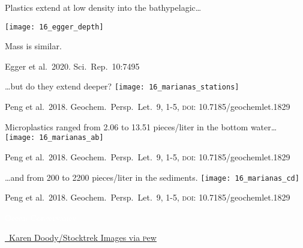 \documentclass[t]{beamer}
\begin{document}
\begin{frame}[b]{Plastics extend at low density into the bathypelagic\dots}

\texttt{[image: 16\_egger\_depth]}

\hangpara Mass is similar.

\tinyfill Egger et al.~2020. Sci.\ Rep.\ 10:7495

\end{frame}
%

\begin{frame}{\dots but do they extend deeper?}
\texttt{[image: 16\_marianas\_stations]}

\tinyfill Peng et al.\ 2018. Geochem.\ Persp.\ Let.\ 9, 1-5, \textsc{doi:} 10.7185/geochemlet.1829
\end{frame}
%
\begin{frame}{Microplastics ranged from 2.06 to 13.51 pieces/liter in the bottom water\dots}
\texttt{[image: 16\_marianas\_ab]}

\tinyfill Peng et al.\ 2018. Geochem.\ Persp.\ Let.\ 9, 1-5, \textsc{doi:} 10.7185/geochemlet.1829
\end{frame}
%
\begin{frame}{\dots and from 200 to 2200 pieces/liter in the sediments. \phantom{Just some long words to keep spacing consistent}}
\texttt{[image: 16\_marianas\_cd]}

\hangpara {}

\tinyfill Peng et al.\ 2018. Geochem.\ Persp.\ Let.\ 9, 1-5, \textsc{doi:} 10.7185/geochemlet.1829
\end{frame}
%
{
\begin{frame}

\tinyfill \textcolor{white}{Ocean Conservancy}
\end{frame}
}

{
\begin{frame}



\tinyfill \textcolor{yellow}{\href{https://www.pewtrusts.org/en/research-and-analysis/articles/2018/09/24/plastic-pollution-affects-sea-life-throughout-the-ocean}{\textcopyright\ Karen Doody/Stocktrek Images via \textsc{p}ew}} \end{frame}
}
% 
\end{document}
